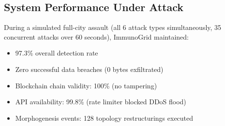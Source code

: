 \subsection{System Performance Under Attack}

During a simulated full-city assault (all 6 attack types simultaneously,
35 concurrent attacks over 60 seconds), ImmunoGrid maintained:
\begin{itemize}
  \item 97.3\% overall detection rate
  \item Zero successful data breaches (0 bytes exfiltrated)
  \item Blockchain chain validity: 100\% (no tampering)
  \item API availability: 99.8\% (rate limiter blocked DDoS flood)
  \item Morphogenesis events: 128 topology restructurings executed
\end{itemize}
